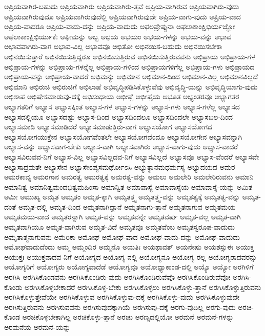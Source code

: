 {ಅಪ್ರಿಯವಾಗಿರ-ಬಹುದು
ಅಪ್ರಿಯವಾಗಿರು
ಅಪ್ರಿಯವಾಗಿರು-ತ್ತವೆ
ಅಪ್ರಿಯ-ವಾಗಿರುವ
ಅಪ್ರಿಯವಾಗಿರು-ವುದು
ಅಪ್ರಿಯವಾಗಿರುವುದೂ
ಅಪ್ರಿಯವಾಗಿರುವುದೆಲ್ಲಿ
ಅಪ್ರಿಯವಾಗಿರುವುದೇ
ಅಪ್ರಿಯ-ವಾಗು-ವುದು
ಅಪ್ರಿಯ-ವಾದ
ಅಪ್ರಿಯ-ವಾದರೂ
ಅಪ್ರಿಯ-ವಾದು-ದನ್ನು
ಅಪ್ರಿಯ-ವಾದುದು
ಅಫಲಪ್ರೇಪ್ಸುನಾ
ಅಫಲಾಕಾಂಕ್ಷಿಭಿರ್ಯಜ್ಞೋ
ಅಫಲಾಕಾಂಕ್ಷಿಭಿರ್ಯುಕೆಃ
ಅಫೀಮನ್ನು
ಅಬ್ಬ
ಅಭಯ
ಅಭಯಂ
ಅಭಯ-ಗಳನ್ನು
ಅಭಯ-ವನ್ನು
ಅಭಾವ
ಅಭಾವವಾಗಿರು-ವಾಗ
ಅಭಾವ-ವಿಲ್ಲ
ಅಭಾವವೂ
ಅಭಿತೋ
ಅಭಿನಯಿಸ-ಬಹುದು
ಅಭಿನಯಿಸಬೇಕಾ
ಅಭಿನಯಿಸುತ್ತಾರೆ
ಅಭಿನಯಿಸುತ್ತಿದ್ದರೂ
ಅಭಿನಯಿಸುತ್ತಿರುವ
ಅಭಿನಯಿಸುತ್ತಿರುವವನು
ಅಭಿಪ್ರಾಯ
ಅಭಿಪ್ರಾಯ-ಗಳ
ಅಭಿಪ್ರಾಯ-ಗಳನ್ನು
ಅಭಿಪ್ರಾಯ-ಗಳನ್ನೆಲ್ಲ
ಅಭಿಪ್ರಾಯ-ಗಳಿಂದ
ಅಭಿಪ್ರಾಯಗಳಿಗೆಲ್ಲ
ಅಭಿಪ್ರಾಯ-ಗಳು
ಅಭಿಪ್ರಾಯದ
ಅಭಿಪ್ರಾಯ-ವನ್ನು
ಅಭಿಪ್ರಾಯ-ವಾದರೆ
ಅಭಿಮನ್ಯು
ಅಭಿಮಾನ
ಅಭಿಮಾನ-ದಿಂದ
ಅಭಿಮಾನ-ವಿಲ್ಲ
ಅಭಿಮಾನವಿಲ್ಲದೆ
ಅಭಿಮಾನಿ
ಅಭಿರುಚಿ
ಅಭಿರುಚಿಗೆ
ಅಭಿಲಾಷೆ
ಅಭಿವೃದ್ಧಿಪಡಿಸಿಕೊಳ್ಳುವೆವು
ಅಭಿವೃದ್ಧಿ-ಯನ್ನು
ಅಭಿವೃದ್ಧಿಯಾಗು-ವುದು
ಅಭಿಶಾಪ
ಅಭಿಷೇಕಮಾಡುವು-ದಕ್ಕೆ
ಅಭಿಸಂಧಾಯ
ಅಭೀಪ್ಸೆ
ಅಭೀಪ್ಸೆಯ
ಅಭೂತ
ಅಭ್ಯಂತರವೂ
ಅಭ್ಯಾಗತರ
ಅಭ್ಯಾಗತರಿಗೆ
ಅಭ್ಯಾಸ
ಅಭ್ಯಾಸಕ್ಕಿಂತ
ಅಭ್ಯಾಸ-ಗಳ
ಅಭ್ಯಾಸ-ಗಳನ್ನು
ಅಭ್ಯಾಸ-ಗಳು
ಅಭ್ಯಾಸ-ಗಳೆಲ್ಲ
ಅಭ್ಯಾಸದ
ಅಭ್ಯಾಸದಲ್ಲಿಯೂ
ಅಭ್ಯಾಸದಷ್ಟು
ಅಭ್ಯಾಸ-ದಿಂದ
ಅಭ್ಯಾಸದಿಂದಲೂ
ಅಭ್ಯಾಸದಿಂದಲೇ
ಅಭ್ಯಾಸಬಲ-ದಿಂದ
ಅಭ್ಯಾಸಮಾಡಿ
ಅಭ್ಯಾಸಮಾಡಿದರೆ
ಅಭ್ಯಾಸಮಾಡುತ್ತಿರು-ವಾಗ
ಅಭ್ಯಾಸಯೋಗ
ಅಭ್ಯಾಸಯೋಗದ
ಅಭ್ಯಾಸಯೋಗಯುಕ್ತೇನ
ಅಭ್ಯಾಸಯೋಗವೆಂತಲೇ
ಅಭ್ಯಾಸಯೋಗವೆಂದೂ
ಅಭ್ಯಾಸಯೋಗೇನ
ಅಭ್ಯಾಸವನ್ನಾಗಿ
ಅಭ್ಯಾಸ-ವನ್ನು
ಅಭ್ಯಾಸವಾಗ-ಬೇಕು
ಅಭ್ಯಾಸ-ವಾಗಿ
ಅಭ್ಯಾಸವಾಗಿರು
ಅಭ್ಯಾಸ-ವಾಗು-ವುದು
ಅಭ್ಯಾಸ-ವಾದರೆ
ಅಭ್ಯಾಸವಿರುವವ-ನಿಗೆ
ಅಭ್ಯಾಸ-ವಿಲ್ಲ
ಅಭ್ಯಾಸವಿಲ್ಲದವ-ನಿಗೆ
ಅಭ್ಯಾಸವಿಲ್ಲದೆ
ಅಭ್ಯಾಸವೂ
ಅಭ್ಯಾಸ-ವೆಂದರೆ
ಅಭ್ಯಾಸವೇ
ಅಭ್ಯಾಸಾದ್ರಮತೇ
ಅಭ್ಯಾಸೇನ
ಅಭ್ಯಾಸೇಽಪ್ಯಸಮರ್ಥೋಽಸಿ
ಅಭ್ಯುತ್ಥಾನಮಧರ್ಮಸ್ಯ
ಅಭ್ಯುದಯದ
ಅಮರ
ಅಮರಕಾವ್ಯ
ಅಮರಗಾನ
ಅಮರತ್ವ
ಅಮರತ್ವಕ್ಕೆ
ಅಮರತ್ವ-ವನ್ನು
ಅಮಲು
ಅಮಲೇರಿ
ಅಮಲೇರಿರುವನು
ಅಮಾನಿ
ಅಮಾನಿತ್ವ
ಅಮಾನಿತ್ವಮಂದಭಿತ್ವಮಹಿಂಸಾ
ಅಮಾನ್ವಿತ
ಅಮಾವಾಸ್ಯೆ
ಅಮಾವಾಸ್ಯೆಯ
ಅಮಾವಾಸ್ಯೆ-ಯನ್ನು
ಅಮಿತ
ಅಮೀ
ಅಮುಖ್ಯ
ಅಮೃತ
ಅಮೃತಂ
ಅಮೃತ-ಕ್ಕಾಗಿ
ಅಮೃತತ್ತ್ವ
ಅಮೃತತ್ತ್ವ-ವನ್ನು
ಅಮೃತತ್ವಕ್ಕೆ
ಅಮೃತತ್ವ-ವನ್ನು
ಅಮೃತ-ದಂತೆ
ಅಮೃತ-ದಲ್ಲಿ
ಅಮೃತ-ದಿಂದ
ಅಮೃತನಾಗಿದ್ದಾನೆ
ಅಮೃತನಾಗು-ತ್ತಾನೆ
ಅಮೃತನಾಗುವ
ಅಮೃತಮಯ
ಅಮೃತಮಯ-ವಾದ
ಅಮೃತರನ್ನಾಗಿ
ಅಮೃತ-ವನ್ನು
ಅಮೃತವನ್ನೇ
ಅಮೃತವರ್ಷ
ಅಮೃತ-ವಲ್ಲ
ಅಮೃತ-ವಾಗಿ
ಅಮೃತವಾಗಿಯೂ
ಅಮೃತ-ವಾಗಿರುವ
ಅಮೃತ-ವಿದೆ
ಅಮೃತವೂ
ಅಮೃತವೆಂಬ
ಅಮೃತಸ್ವರೂಪ-ವಾದುದು
ಅಮೃತಾತ್ಮನಾಗುವನು
ಅಮೆರಿಕಾ
ಅಮೋಘ
ಅಮೋಘ-ವಾದ
ಅಮೋಘ-ವಾದು-ದನ್ನು
ಅಮೋಘ-ವಾದುದು
ಅಮೋಘವಾದುದೆಂದು
ಅಮ್ಮ
ಅಮ್ಮಂದಿರ
ಅಮ್ಮನೊ
ಅಯತಿಃ
ಅಯಥಾವತ್
ಅಯನೇಷು
ಅಯಶಸ್ಸುಈ
ಅಯುಕ್ತ
ಅಯುಕ್ತಃ
ಅಯುಕ್ತನಾದವ-ನಿಗೆ
ಅಯೋಗ್ಯದ
ಅಯೋಗ್ಯ-ನಲ್ಲಿ
ಅಯೋಗ್ಯನೂ
ಅಯೋಗ್ಯ-ರಲ್ಲ
ಅಯೋಗ್ಯರಾದವರನ್ನು
ಅಯೋಗ್ಯರಿಗೆ
ಅಯೋಗ್ಯರು
ಅಯೋಗ್ಯವಾದೆಡೆ
ಅಯೋಗ್ಯವೂ
ಅಯೋಧ್ಯಾಕಾಂಡ-ದಲ್ಲಿ
ಅಯ್ಯೊ
ಅಯ್ಯೋ
ಅರಗಿಳಿಗೆ
ಅರಗಿಸಿ
ಅರಗಿಸಿಕೊಂಡವನು
ಅರಗಿಸಿಕೊಂಡಿರು-ವುದು
ಅರಗಿಸಿಕೊಂಡಿರುವೆವೊ
ಅರಗಿಸಿಕೊಂಡಿರುವೆವೋ
ಅರಗಿಸಿ-ಕೊಂಡು
ಅರಗಿಸಿಕೊಳ್ಳಬೇಕಾದರೆ
ಅರಗಿಸಿಕೊಳ್ಳ-ಬೇಕು
ಅರಗಿಸಿಕೊಳ್ಳಲು
ಅರಗಿಸಿಕೊಳ್ಳು-ತ್ತಾನೆ
ಅರಗಿಸಿಕೊಳ್ಳುತ್ತಿರುವನು
ಅರಗಿಸಿಕೊಳ್ಳುತ್ತೇವೆಯೇ
ಅರಗಿಸಿಕೊಳ್ಳುವ
ಅರಗಿಸಿಕೊಳ್ಳುವು-ದಕ್ಕೆ
ಅರಗಿಸಿಕೊಳ್ಳು-ವುದು
ಅರಗಿಸಿಕೊಳ್ಳುವುದೇ
ಅರಗಿಸುತ್ತಿರುವನು
ಅರಗಿಸುವವನು
ಅರಗಿಸುವುದಕ್ಕಾಗಿಯೆ
ಅರಗಿಸುವು-ದಕ್ಕೆ
ಅರಗು-ವುದಿಲ್ಲ
ಅರಗು-ವುದು
ಅರಚಿ-ಕೊಂಡ
ಅರಚಿಕೊಳ್ಳಬೇಕಾಗಿಲ್ಲ
ಅರಚಿಕೊಳ್ಳು-ತ್ತಾನೆ
ಅರಚು
ಅರಣ್ಯದಲ್ಲಿಯೋ
ಅರಮನೆ
ಅರಮನೆ-ಗಳನ್ನು
ಅರಮನೆಯ
ಅರಮನೆ-ಯನ್ನು
}
